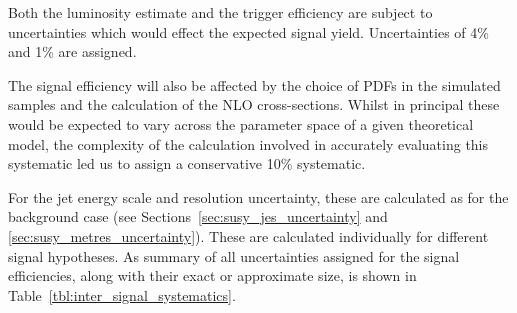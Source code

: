 Both the luminosity estimate and the trigger efficiency are subject to
uncertainties which would effect the expected signal yield. Uncertainties of 4\%
and 1\% are assigned.

The signal efficiency will also be affected by the choice of \acp{PDF} in the
simulated samples and the calculation of the \ac{NLO} cross-sections. Whilst in
principal these would be expected to vary across the parameter space of a given
theoretical model, the complexity of the calculation involved in accurately
evaluating this systematic led us to assign a conservative 10\% systematic.

For the jet energy scale and \MET resolution uncertainty, these are calculated
as for the background case (see Sections~\ref{sec:susy_jes_uncertainty} and
\ref{sec:susy_metres_uncertainty}). These are calculated individually for
different signal hypotheses. As summary of all uncertainties assigned for the
signal efficiencies, along with their exact or approximate size, is shown in
Table~\ref{tbl:inter_signal_systematics}.




\begin{figure}[h!]
\centering
{}\quad
{}
\caption[]{}
\label{fig:inter_pl}
\end{figure}

\begin{figure}[h!]
\centering
{}\quad
{}\\
\quad
{}\\
\caption[]{}
\label{fig:inter_cls}
\end{figure}


